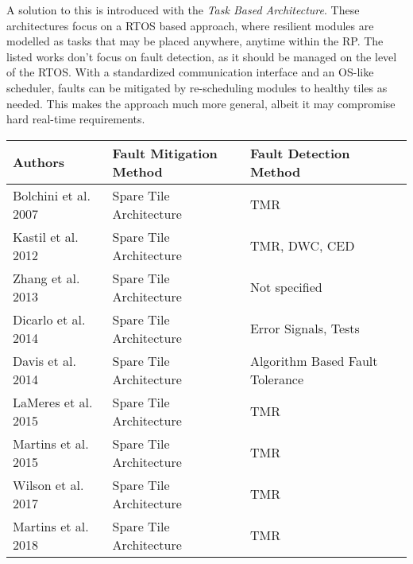 A solution to this is introduced with the \textit{Task Based Architecture}.
These architectures focus on a \gls{RTOS} based approach, where resilient modules are modelled as tasks that may be placed anywhere, anytime within the \gls{RP}. 
The listed works don't focus on fault detection, as it should be managed on the level of the \gls{RTOS}.
With a standardized communication interface and an OS-like scheduler, faults can be mitigated by re-scheduling modules to healthy tiles as needed. 
This makes the approach much more general, albeit it may compromise hard real-time requirements.
\begin{strip}
    \centering
    \label{tbl:literatureOverview}
    \centering \begin{tabularx}{\textwidth}{lll >{\arraybackslash}X}
        \toprule
       \textbf{Authors} & \textbf{Fault Mitigation Method} & \textbf{Fault Detection Method} \\
       \midrule
       \cite{bolchini2007} Bolchini et al. 2007             & Spare Tile Architecture      & TMR  \\
       \cite{kastil2012} Kastil et al. 2012                 & Spare Tile Architecture      & TMR, DWC, CED  \\
       \cite{zhang2013} Zhang et al. 2013                   & Spare Tile Architecture      & Not specified \\
       \cite{dicarlo2014} Dicarlo et al. 2014               & Spare Tile Architecture      & Error Signals, Tests \\
       \cite{davis2014} Davis et al. 2014                   & Spare Tile Architecture      & Algorithm Based Fault Tolerance \\
       \cite{lameres2015} LaMeres et al. 2015       & Spare Tile Architecture      & TMR  \\
       \cite{martins_tmr_2015} Martins et al. 2015          & Spare Tile Architecture      & TMR  \\
       \cite{wilson_hybrid_2017} Wilson et al. 2017         & Spare Tile Architecture      & TMR  \\
       \cite{martins_dynamic_2018} Martins et al. 2018      & Spare Tile Architecture      & TMR  \\

\end{tabularx}
\end{strip}
